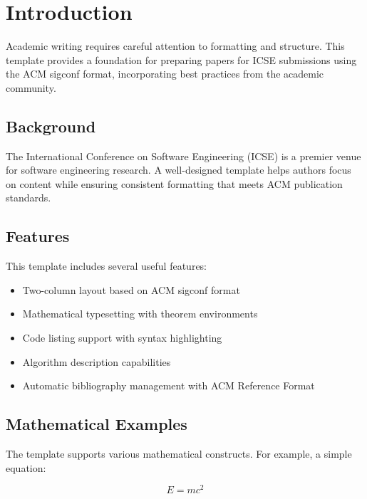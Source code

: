 
\section{Introduction}
\label{sec:introduction}

Academic writing requires careful attention to formatting and structure.
This template provides a foundation for preparing papers for ICSE submissions
using the ACM sigconf format, incorporating best practices from the academic community.

\subsection{Background}

The International Conference on Software Engineering (ICSE) is a premier venue
for software engineering research. A well-designed template helps authors focus
on content while ensuring consistent formatting that meets ACM publication standards.

\subsection{Features}

This template includes several useful features:

\begin{itemize}
    \item Two-column layout based on ACM sigconf format
    \item Mathematical typesetting with theorem environments
    \item Code listing support with syntax highlighting
    \item Algorithm description capabilities
    \item Automatic bibliography management with ACM Reference Format
\end{itemize}

\subsection{Mathematical Examples}

The template supports various mathematical constructs.
For example, a simple equation:

\begin{equation}
    E = mc^2
    \label{eq:einstein}
\end{equation}

